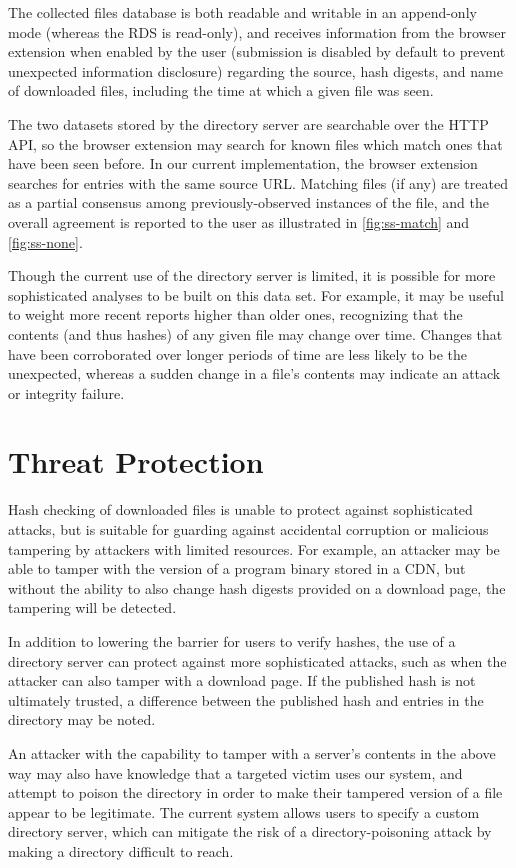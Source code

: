 \documentclass[letterpaper,twocolumn,10pt]{article}
\begin{document}
The collected files database is both readable and writable in an append-only mode
(whereas the RDS is read-only), and receives information from the browser extension
when enabled by the user (submission is disabled by default to prevent unexpected
information disclosure) regarding the source, hash digests, and name of downloaded
files, including the time at which a given file was seen.

The two datasets stored by the directory server are searchable over the HTTP
API, so the browser extension may search for known files which match ones
that have been seen before. In our current implementation, the browser extension
searches for entries with the same source URL. Matching files (if any) are
treated as a partial consensus among previously-observed instances of the file,
and the overall agreement is reported to the user as illustrated in \autoref{fig:ss-match}
and \autoref{fig:ss-none}.

Though the current use of the directory server is limited, it is possible for more
sophisticated analyses to be built on this data set. For example, it may be
useful to weight more recent reports higher than older ones, recognizing
that the contents (and thus hashes) of any given file may change over time.
Changes that have been corroborated over longer periods of time are less
likely to be the unexpected, whereas a sudden change in a file's contents may indicate
an attack or integrity failure.

\section{Threat Protection}

Hash checking of downloaded files is unable to protect against sophisticated attacks, but is
suitable for guarding against accidental corruption or malicious tampering by attackers with
limited resources. For example, an attacker may be able to tamper with the version of a
program binary stored in a CDN, but without the ability to also change hash digests provided
on a download page, the tampering will be detected.

In addition to lowering the barrier for users to verify hashes, the use of a directory
server can protect against more sophisticated attacks, such as when the attacker can also
tamper with a download page. If the published hash is not ultimately trusted,
a difference between the published hash and entries in the directory may be noted.

An attacker with the capability to tamper with a server's contents in the above way may
also have knowledge that a targeted victim uses our system, and attempt to poison the
directory in order to make their tampered version of a file appear to be legitimate. The
current system allows users to specify a custom directory server, which can mitigate the
risk of a directory-poisoning attack by making a directory difficult to reach.
\end{document}
